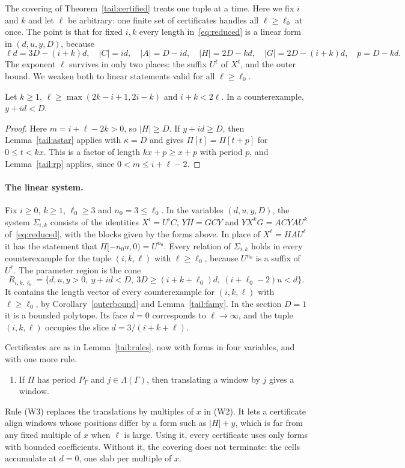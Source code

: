 The covering of Theorem~\ref{tail:certified} treats one tuple at a time. Here we fix \(i\) and \(k\) and let \(\ell\) be arbitrary: one finite set of certificates handles all \(\ell\ge\ell_0\) at once. The point is that for fixed \(i,k\) every length in~\eqref{eq:reduced} is a linear form in \((d,u,y,D)\), because
\[
\ell d=3D-(i+k)d,\quad |C|=id,\quad |A|=D-id,\quad |H|=2D-kd,\quad |G|=2D-(i+k)d,\quad p=D-kd .
\]
The exponent \(\ell\) survives in only two places: the suffix \(U^\ell\) of \(X^\ell\), and the outer bound. We weaken both to linear statements valid for all \(\ell\ge\ell_0\).

\begin{lemma}\label{tail:famy}
Let \(k\ge1\), \(\ell\ge\max(2k-i+1,2i-k)\) and \(i+k<2\ell\). In a counterexample, \(y+id<D\).
\end{lemma}
\begin{proof}
Here \(m=i+\ell-2k>0\), so \(|H|\ge D\). If \(y+id\ge D\), then Lemma~\ref{tail:astar} applies with \(\kappa=D\) and gives \(\Pi[t]=\Pi[t+p]\) for \(0\le t<kx\). This is a factor of length \(kx+p\ge x+p\) with period \(p\), and Lemma~\ref{tail:rp} applies, since \(0<m\le i+\ell-2\).
\end{proof}

\paragraph{The linear system.} Fix \(i\ge0\), \(k\ge1\), \(\ell_0\ge3\) and \(n_0=3\le\ell_0\). In the variables \((d,u,y,D)\), the system \(\Sigma_{i,k}\) consists of the identities \(X^i=U^iC\), \(YH=GCY\) and \(YX^kG=ACYAU^k\) of~\eqref{eq:reduced}, with the blocks given by the forms above. In place of \(X^\ell=HAU^\ell\) it has the statement that \(\Pi[-n_0u,0)=U^{n_0}\). Every relation of \(\Sigma_{i,k}\) holds in every counterexample for the tuple \((i,k,\ell)\) with \(\ell\ge\ell_0\), because \(U^{n_0}\) is a suffix of \(U^\ell\). The parameter region is the cone
\[
R_{i,k,\ell_0}=\{d,u,y>0,\ y+id<D,\ 3D\ge(i+k+\ell_0)d,\ (i+\ell_0-2)u<d\}.
\]
It contains the length vector of every counterexample for \((i,k,\ell)\) with \(\ell\ge\ell_0\), by Corollary~\ref{outerbound} and Lemma~\ref{tail:famy}. In the section \(D=1\) it is a bounded polytope. Its face \(d=0\) corresponds to \(\ell\to\infty\), and the tuple \((i,k,\ell)\) occupies the slice \(d=3/(i+k+\ell)\).

Certificates are as in Lemma~\ref{tail:rules}, now with forms in four variables, and with one more rule.
\begin{enumerate}
\item[(W3)] If \(\Pi\) has period \(P_\Gamma\) and \(j\in\Lambda(\Gamma)\), then translating a window by \(j\) gives a window.
\end{enumerate}
Rule (W3) replaces the translations by multiples of \(x\) in (W2). It lets a certificate align windows whose positions differ by a form such as \(|H|+y\), which is far from any fixed multiple of \(x\) when \(\ell\) is large. Using it, every certificate uses only forms with bounded coefficients. Without it, the covering does not terminate: the cells accumulate at \(d=0\), one slab per multiple of \(x\).

